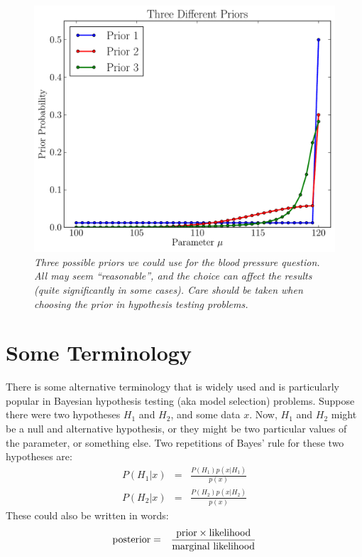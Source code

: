 \begin{figure}[!ht]
\begin{center}
\includegraphics[scale=0.6]{Figures/testing_priors.pdf}
\caption{\it Three possible priors we could use for the blood pressure question.
All may seem ``reasonable'', and the choice can affect the results (quite
significantly in some cases). Care should be taken when choosing the prior
in hypothesis testing problems.
\label{fig:testing_priors}}
\end{center}
\end{figure}


\section{Some Terminology}
There is some alternative terminology that is widely used and is particularly
popular in Bayesian hypothesis testing (aka model selection) problems. Suppose
there were two hypotheses $H_1$ and $H_2$, and some data $x$. Now, $H_1$ and
$H_2$ might be a null and alternative hypothesis, or they might be two
particular values of the parameter, or something else. Two repetitions of Bayes' rule
for these two hypotheses are:
\begin{eqnarray}
P(H_1 | x) &=& \frac{P(H_1)p(x|H_1)}{p(x)}\\
P(H_2 | x) &=& \frac{P(H_2)p(x|H_2)}{p(x)}
\end{eqnarray}
These could also be written in words:
\begin{eqnarray}
\textnormal{posterior} &=& \frac{\textnormal{prior}\times\textnormal{likelihood}}{\textnormal{marginal likelihood}}
\end{eqnarray}

